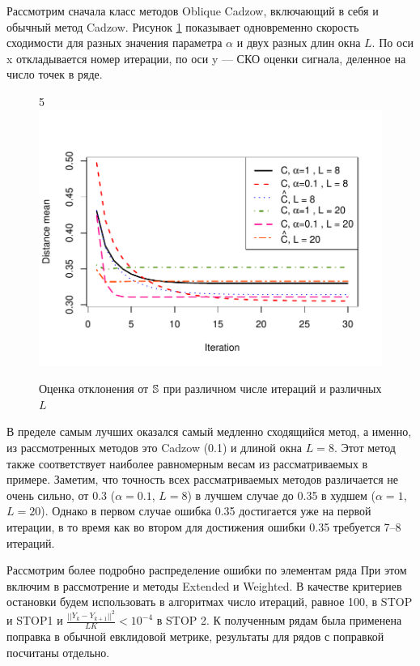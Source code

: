 \documentclass[12pt,a4paper,fleqn,leqno]{article}
\begin{document}
Рассмотрим сначала класс методов Oblique Cadzow, включающий в себя и обычный метод Cadzow.
Рисунок \ref{img_cadzowspeed2} показывает одновременно скорость сходимости для разных значения параметра $\alpha$ и двух разных длин окна $L$.
По оси x откладывается номер итерации, по оси y --- СКО оценки сигнала, деленное на число точек в ряде.  
\begin{figure}[!hhh] 
\begin{center}
5\includegraphics[width = 15cm]{cadzowspeed_2.pdf}
\caption{Оценка отклонения от $\mathbb{S}$ при различном числе итераций и различных $L$}
\label{img_cadzowspeed2}
\end{center}
\end{figure}

В пределе самым лучших оказался самый медленно сходящийся метод, а именно, из рассмотренных методов это Cadzow (0.1) и длиной окна $L=8$.
Этот метод также соответствует наиболее равномерным весам из рассматриваемых в примере.
Заметим, что точность всех рассматриваемых методов различается не очень сильно, от 0.3 ($\alpha=0.1$, $L=8$) в лучшем случае до 0.35 в худшем
($\alpha=1$, $L=20$). Однако в первом случае ошибка 0.35 достигается уже на первой итерации, в то время как во втором для
достижения ошибки 0.35 требуется 7--8 итераций.

Рассмотрим более подробно распределение ошибки по элементам ряда При этом включим в рассмотрение и
методы Extended и Weighted.
В качестве критериев остановки будем использовать в алгоритмах число итераций, равное 100, в STOP и STOP1
и $\frac{||Y_k - Y_{k+1}||^2}{LK} < 10^{-4}$ в STOP 2. К полученным рядам была применена поправка в обычной евклидовой метрике, результаты для рядов с поправкой посчитаны отдельно.
\end{document}
